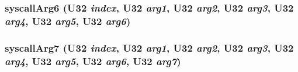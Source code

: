 \subsubsection{ syscall\-Arg6 ({\bf U32} {\em index}, {\bf U32} {\em arg1}, {\bf U32} {\em arg2}, {\bf U32} {\em arg3}, {\bf U32} {\em arg4}, {\bf U32} {\em arg5}, {\bf U32} {\em arg6})}\label{syscall_8h_a34}


\subsubsection{ syscall\-Arg7 ({\bf U32} {\em index}, {\bf U32} {\em arg1}, {\bf U32} {\em arg2}, {\bf U32} {\em arg3}, {\bf U32} {\em arg4}, {\bf U32} {\em arg5}, {\bf U32} {\em arg6}, {\bf U32} {\em arg7})}\label{syscall_8h_a35}


